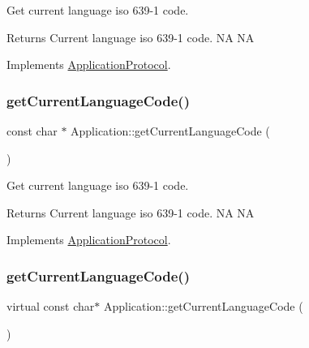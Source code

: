 Get current language iso 639-\/1 code. 

\begin{DoxyReturn}{Returns}
Current language iso 639-\/1 code.  NA  NA 
\end{DoxyReturn}


Implements \hyperlink{classApplicationProtocol_a4cb7a696dd51fee3ebb3075f0cca1455}{Application\+Protocol}.

\mbox{\label{classApplication_aa110b9387e32148fec4bf913250bbac2}} 
\subsubsection{\texorpdfstring{get\+Current\+Language\+Code()}{getCurrentLanguageCode()}\hspace{0.1cm}{\footnotesize\ttfamily [3/12]}}
{\footnotesize\ttfamily const char $\ast$ Application\+::get\+Current\+Language\+Code (\begin{DoxyParamCaption}{ }\end{DoxyParamCaption})\hspace{0.3cm}{\ttfamily [virtual]}}



Get current language iso 639-\/1 code. 

\begin{DoxyReturn}{Returns}
Current language iso 639-\/1 code.  NA  NA 
\end{DoxyReturn}


Implements \hyperlink{classApplicationProtocol_a4cb7a696dd51fee3ebb3075f0cca1455}{Application\+Protocol}.

\mbox{\label{classApplication_aed89715279c32959c41ec88fa65018a7}} 
\subsubsection{\texorpdfstring{get\+Current\+Language\+Code()}{getCurrentLanguageCode()}\hspace{0.1cm}{\footnotesize\ttfamily [4/12]}}
{\footnotesize\ttfamily virtual const char$\ast$ Application\+::get\+Current\+Language\+Code (\begin{DoxyParamCaption}{ }\end{DoxyParamCaption})\hspace{0.3cm}{\ttfamily [virtual]}}



